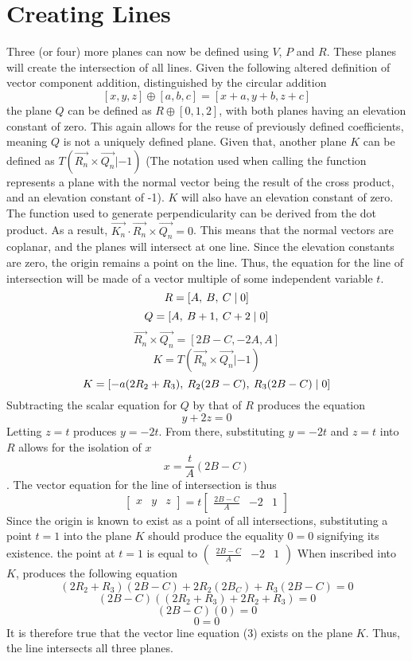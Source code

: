 \documentclass[a4paper, 12pt]{article}
\begin{document}
\section{Creating Lines}
Three (or four) more planes can now be defined using $V$, $P$ and $R$. These planes will create the intersection of all lines. Given the following altered definition of vector component addition, distinguished by the circular addition
\begin{equation}
	\left[x,y,z\right]\oplus\left[a,b,c\right]=\left[x+a, y+b, z+c\right]
\end{equation}
the plane $Q$ can be defined as $R\oplus\left[0,1,2\right]$, with both planes having an elevation constant of zero. This again allows for the reuse of previously defined coefficients, meaning $Q$ is not a uniquely defined plane. Given that, another plane $K$ can be defined as $T(\vec{R_n}\times\vec{Q_n}|-1)$ (The notation used when calling the function represents a plane with the normal vector being the result of the cross product, and an elevation constant of -1). $K$ will also have an elevation constant of zero. The function used to generate perpendicularity can be derived from the dot product. As a result, $\vec{K_n}\cdot\vec{R_n}\times\vec{Q_n} = 0$. This means that the normal vectors are coplanar, and the planes will intersect at one line. Since the elevation constants are zero, the origin remains a point on the line. Thus, the equation for the line of intersection will be made of a vector multiple of some independent variable $t$. 
$$R = \left[A, \: B, \: C\; | \; 0\right]$$
$$Q = \left[A, \: B+1, \: C+2\; | \; 0\right]$$
$$\vec{R_n}\times\vec{Q_n} = [2B-C, -2A, A]$$
$$K = T(\vec{R_n}\times\vec{Q_n}|-1)$$
$$K = \left[-a(2R_2+R_3), \: R_2(2B-C), \: R_3(2B-C)\; | \; 0\right]$$
Subtracting the scalar equation for $Q$ by that of $R$ produces the equation
$$y + 2z = 0$$
Letting $z=t$ produces $y=-2t$.
From there, substituting $y=-2t$ and $z=t$ into $R$ allows for the isolation of $x$
$$x=\frac{t}{A}(2B-C)$$.
The vector equation for the line of intersection is thus
\begin{equation}
    \begin{bmatrix}
    x & y & z
    \end{bmatrix}
    = t
    \begin{bmatrix}
        \frac{2B-C}{A} & -2 & 1
    \end{bmatrix}
\end{equation}
Since the origin is known to exist as a point of all intersections, substituting a point $t=1$ into the plane $K$ should produce the equality $0=0$ signifying its existence.
\newline
the point at $t=1$ is equal to 
$\begin{pmatrix}
    \frac{2B-C}{A} & -2 & 1
\end{pmatrix}$ When inscribed into $K$, produces the following equation
$$(2R_2+R_3)(2B-C) + 2R_2(2B_C) + R_3(2B-C) = 0$$
$$(2B-C)((2R_2 + R_3) + 2R_2 + R_3) = 0$$
$$(2B-C)(0) = 0$$
$$0=0$$
It is therefore true that the vector line equation (3) exists on the plane $K$. Thus, the line intersects all three planes.
\end{document}
